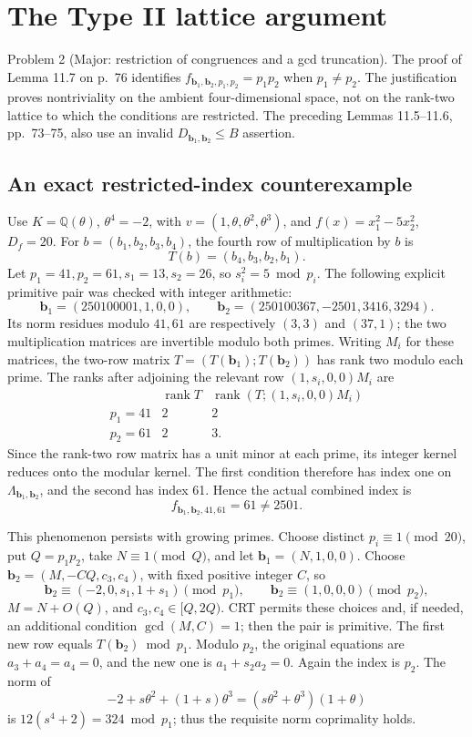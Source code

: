 \documentclass[10pt]{article}
\begin{document}
\section*{The Type II lattice argument}
Problem 2 (Major: restriction of congruences and a gcd truncation).  The proof of Lemma 11.7 on p. 76 identifies \(f_{\mathbf b_1,\mathbf b_2,p_1,p_2}=p_1p_2\) when \(p_1\ne p_2\). The justification proves nontriviality on the ambient four-dimensional space, not on the rank-two lattice to which the conditions are restricted. The preceding Lemmas 11.5–11.6, pp. 73–75, also use an invalid \(D_{\mathbf b_1,\mathbf b_2}\le B\) assertion.\par
\subsection*{An exact restricted-index counterexample}
Use \(K=\mathbb Q(\theta)\), \(\theta^4=-2\), with \(v=(1,\theta,\theta^2,\theta^3)\), and \(f(x)=x_1^2-5x_2^2\), \(D_f=20\). For \(b=(b_1,b_2,b_3,b_4)\), the fourth row of multiplication by \(b\) is \[T(b)=(b_4,b_3,b_2,b_1).\] Let \(p_1=41,p_2=61,s_1=13,s_2=26\), so \(s_i^2=5\bmod p_i\). The following explicit primitive pair was checked with integer arithmetic: \[\mathbf b_1=(250100001,1,0,0),\qquad
 \mathbf b_2=(250100367,-2501,3416,3294).\] Its norm residues modulo \(41,61\) are respectively \((3,3)\) and \((37,1)\); the two multiplication matrices are invertible modulo both primes. Writing \(M_i\) for these matrices, the two-row matrix \(T=(T(\mathbf b_1);T(\mathbf b_2))\) has rank two modulo each prime. The ranks after adjoining the relevant row \((1,s_i,0,0)M_i\) are \[\begin{array}{c|cc}
 &\operatorname{rank}T&\operatorname{rank}(T;(1,s_i,0,0)M_i)\\ \hline
 p_1=41&2&2\\
 p_2=61&2&3.
 \end{array}\] Since the rank-two row matrix has a unit minor at each prime, its integer kernel reduces onto the modular kernel. The first condition therefore has index one on \(\Lambda_{\mathbf b_1,\mathbf b_2}\), and the second has index 61. Hence the actual combined index is \[f_{\mathbf b_1,\mathbf b_2,41,61}=61\ne2501.\]\par
This phenomenon persists with growing primes. Choose distinct \(p_i\equiv1\pmod{20}\), put \(Q=p_1p_2\), take \(N\equiv1\pmod Q\), and let \(\mathbf b_1=(N,1,0,0)\). Choose \(\mathbf b_2=(M,-CQ,c_3,c_4)\), with fixed positive integer \(C\), so \[\mathbf b_2\equiv(-2,0,s_1,1+s_1)\pmod{p_1},\qquad
 \mathbf b_2\equiv(1,0,0,0)\pmod{p_2},\] \(M=N+O(Q)\), and \(c_3,c_4\in[Q,2Q)\). CRT permits these choices and, if needed, an additional condition \(\gcd(M,C)=1\); then the pair is primitive. The first new row equals \(T(\mathbf b_2)\bmod p_1\). Modulo \(p_2\), the original equations are \(a_3+a_4=a_4=0\), and the new one is \(a_1+s_2a_2=0\). Again the index is \(p_2\). The norm of \[-2+s\theta^2+(1+s)\theta^3
 =(s\theta^2+\theta^3)(1+\theta)\] is \(12(s^4+2)=324\bmod p_1\); thus the requisite norm coprimality holds.\par
\end{document}
